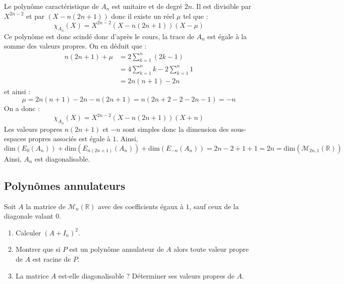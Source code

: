 \documentclass[a4paper,twoside,french,10pt]{VcCours}
\begin{document}
\begin{enumerate}
Le polynôme caractéristique de $A_n$ est unitaire et de degré $2n$. Il est divisible par $X^{2n-2}$ et par $(X- n(2n+1))$ donc il existe un réel $\mu$ tel que :
$$ \chi_{A_n}(X) = X^{2n-2} (X- n(2n+1)) (X- \mu)$$
Ce polynôme est donc scindé donc d'après le cours, la trace de $A_n$ est égale à la somme des valeurs propres. On en déduit que :
\begin{align*}
 n(2n+1) + \mu & = 2 \sum_{k=1}^n (2k-1) \\
 & = 4 \sum_{k=1}^n k - 2 \sum_{k=1}^n 1 \\
 & = 2n(n+1) -2n 
 \end{align*}
 et ainsi :
 $$ \mu = 2n(n+1)-2n-n(2n+1) = n(2n+2-2-2n-1) = -n$$
 On a donc :
 $$  \chi_{A_n}(X) = X^{2n-2} (X- n(2n+1)) (X+n)$$
 Les valeurs propres $n(2n+1)$ et $-n$ sont simples donc la dimension des sous-espaces propres associés est égale à $1$. Ainsi,
 $$ \textrm{dim}(E_0(A_n))+ \textrm{dim}(E_{n(2n+1)}(A_n))+ \textrm{dim}(E_{-n}(A_n)) = 2n-2+1+1=2n = \textrm{dim}(\mathcal{M}_{2n,1}(\mathbb{R}))$$
Ainsi, $A_n$ est diagonalisable.
\end{enumerate}


\subsection{Polynômes annulateurs}


\begin{Exercice}{} Soit $A$ la matrice de $\mathcal{M}_n(\mathbb{R})$ avec des coefficients égaux à $1$, sauf ceux de la diagonale valant $0$.

\begin{enumerate}
\item Calculer $(A+I_n)^2$.
\item Montrer que si $P$ est un polynôme annulateur de $A$ alors toute valeur propre de $A$ est racine de $P$.
\item La matrice $A$ est-elle diagonalisable ? Déterminer ses valeurs propres de $A$. 
\end{enumerate}
\end{Exercice}
\end{document}
